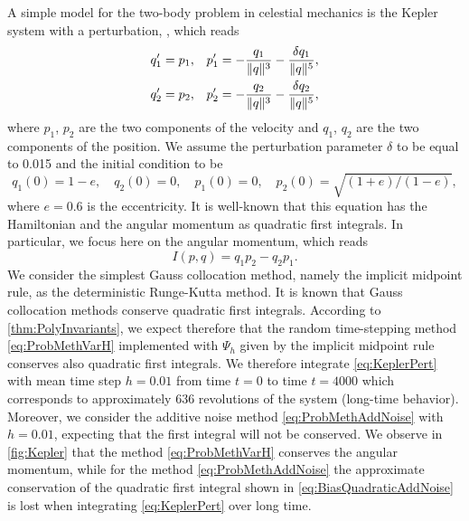 \documentclass[final,onefignum,onetabnum]{siamonline171218}
\begin{document}
A simple model for the two-body problem in celestial mechanics is the Kepler system with a perturbation, , which reads
\begin{equation}\label{eq:KeplerPert}
\begin{aligned}
	q_1' &= p_1, && p_1' = -\frac{q_1}{\norm{q}^3} - \frac{\delta q_1}{\norm{q}^5}, \\
	q_2' &= p_2, && p_2' = -\frac{q_2}{\norm{q}^3} - \frac{\delta q_2}{\norm{q}^5},
\end{aligned}
\end{equation}
where $p_1$, $p_2$ are the two components of the velocity and $q_1$, $q_2$ are the two components of the position. We assume the perturbation parameter $\delta$ to be equal to 0.015 and the initial condition to be
\begin{equation}
	q_1(0) = 1 − e,\quad q_2(0) = 0, \quad p_1(0) = 0, \quad p_2(0) = \sqrt{(1 + e)/(1 − e)},
\end{equation}
where $e = 0.6$ is the eccentricity. It is well-known that this equation has the Hamiltonian and the angular momentum as quadratic first integrals. In particular, we focus here on the angular momentum, which reads
\begin{equation}
	I(p, q) = q_1p_2 - q_2p_1.
\end{equation}
We consider the simplest Gauss collocation method, namely the implicit midpoint rule, as the deterministic Runge-Kutta method. It is known that Gauss collocation methods conserve quadratic first integrals. According to \cref{thm:PolyInvariants}, we expect therefore that the random time-stepping method \eqref{eq:ProbMethVarH} implemented with $\Psi_h$ given by the implicit midpoint rule conserves also quadratic first integrals. We therefore integrate \eqref{eq:KeplerPert} with mean time step $h = 0.01$ from time $t = 0$ to time $t = 4000$ which corresponds to approximately $636$ revolutions of the system (long-time behavior). Moreover, we consider the additive noise method \eqref{eq:ProbMethAddNoise} with $h = 0.01$, expecting that the first integral will not be conserved. We observe in \cref{fig:Kepler} that the method \eqref{eq:ProbMethVarH} conserves the angular momentum, while for the method \eqref{eq:ProbMethAddNoise} the approximate conservation of the quadratic first integral shown in \eqref{eq:BiasQuadraticAddNoise} is lost when integrating \eqref{eq:KeplerPert} over long time.
\end{document}
